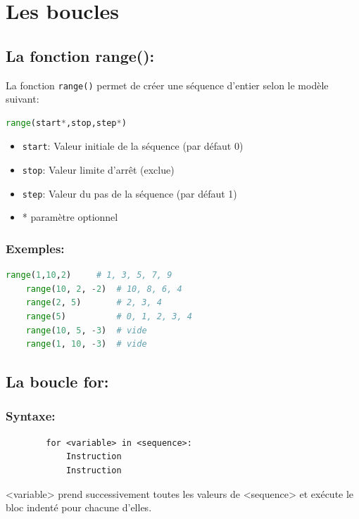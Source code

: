 \documentclass[a4paper,12pt,twoside]{article}
\begin{document}
    \section*{Les boucles}
    
    \subsection*{La fonction range():}
    \noindent La fonction \texttt{range()} permet de créer une séquence d'entier selon le modèle suivant:
    \begin{center}
    \begin{lstlisting}[language=Python]
    range(start*,stop,step*)
    \end{lstlisting} 
    \end{center}
    \begin{itemize}
        \item \texttt{start}: Valeur initiale de la séquence (par défaut 0)
        \item \texttt{stop}: Valeur limite d'arrêt (exclue)
        \item \texttt{step}: Valeur du pas de la séquence (par défaut 1)
        \item * paramètre optionnel
    \end{itemize}

    \subsubsection*{Exemples:}
    \begin{lstlisting}[language=Python]
    range(1,10,2)     # 1, 3, 5, 7, 9
    range(10, 2, -2)  # 10, 8, 6, 4
    range(2, 5)       # 2, 3, 4
    range(5)          # 0, 1, 2, 3, 4
    range(10, 5, -3)  # vide
    range(1, 10, -3)  # vide
    \end{lstlisting} 

    \subsection*{La boucle for:}
    \subsubsection*{Syntaxe:}
    \begin{lstlisting}
        for <variable> in <sequence>:
            Instruction
            Instruction
        \end{lstlisting} 
    <variable> prend successivement toutes les valeurs de <sequence> et exécute le bloc indenté pour chacune d'elles.
    \newpage
\end{document}
